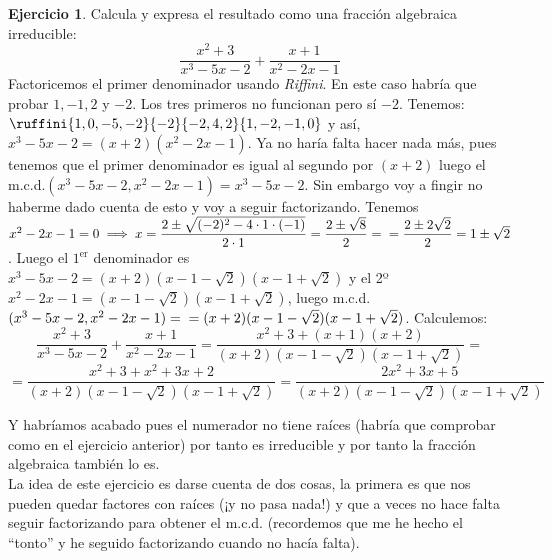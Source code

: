 \documentclass[11pt, oneside]{book}
\theoremstyle{definition} %
\newtheorem{ejercicio}{Ejercicio}
\begin{document}
\begin{ejercicio} Calcula y expresa el resultado como una fracción algebraica irreducible: \[\dfrac{x^2+3}{x^3-5x-2}+\dfrac{x +1}{x^2-2x-1}\]
Factoricemos el primer denominador usando \textit{Riffini}. En este caso habría que probar $1,-1,2$ y $-2$. Los tres primeros no funcionan pero sí $-2$. Tenemos: $\ruffini{1,0,-5,-2}{-2}{-2,4,2}{1,-2,-1,0}$ y así, $x^3-5x-2=(x+2)(x^2-2x-1)$. Ya no haría falta hacer nada más, pues tenemos que el primer denominador es igual al segundo por $(x+2)$ luego el m.c.d.$(x^3-5x-2,x^2-2x-1)=x^3-5x-2$. Sin embargo voy a fingir no haberme dado cuenta de esto y voy a seguir factorizando. Tenemos $x^2-2x-1=0\implies x=\dfrac{2\pm\sqrt{(-2)^2-4\cdot1\cdot(-1)}}{2\cdot1}=\dfrac{2\pm\sqrt{8}}{2}=\\=\dfrac{2\pm2\sqrt{2}}{2}=1\pm\sqrt{2}$. Luego el $1^{\mathrm{er}}$ denominador es $x^3-5x-2=(x+2)(x-1-\sqrt{2})(x-1+\sqrt{2})$ y el 2º $x^2-2x-1=(x-1-\sqrt{2})(x-1+\sqrt{2})$, luego m.c.d.$(x^3-5x-2,x^2-2x-1)=\\=(x+2)(x-1-\sqrt{2})(x-1+\sqrt{2})$. Calculemos:
\[\dfrac{x^2+3}{x^3-5x-2}+\dfrac{x +1}{x^2-2x-1}=\dfrac{x^2+3+(x+1)(x+2)}{(x+2)(x-1-\sqrt{2})(x-1+\sqrt{2})}=\]
\[=\dfrac{x^2+3+x^2+3x+2}{(x+2)(x-1-\sqrt{2})(x-1+\sqrt{2})}=\dfrac{2x^2+3x+5}{(x+2)(x-1-\sqrt{2})(x-1+\sqrt{2})}\]

Y habríamos acabado pues el numerador no tiene raíces (habría que comprobar como en el ejercicio anterior) por tanto es irreducible y por tanto la fracción algebraica también lo es.\\

La idea de este ejercicio es darse cuenta de dos cosas, la primera es que nos pueden quedar factores con raíces (¡y no pasa nada!) y que a veces no hace falta seguir factorizando para obtener el m.c.d. (recordemos que me he hecho el ``tonto'' y he seguido factorizando cuando no hacía falta).
\end{ejercicio}
\end{document}
